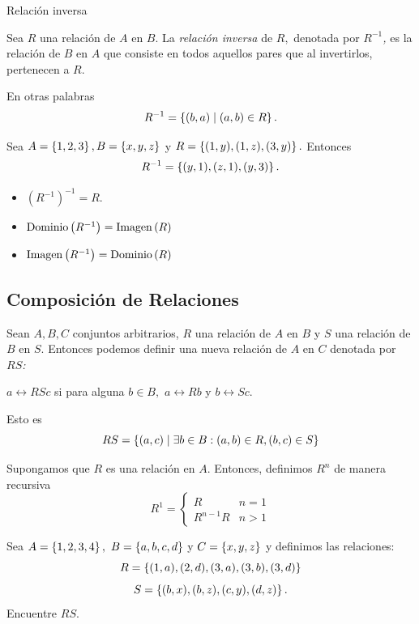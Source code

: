 	{Relación inversa}
	
	Sea $R$ una relación de $A$ en $B.$ La \emph{relación inversa} de $R,$ denotada por \emph{$R^{-1}$,} es la relación de $B$ en $A$ que consiste en todos aquellos pares que al invertirlos, pertenecen a $R.$ 
	
	En otras palabras
	$$
	R^{-1}=\left\{ (b,a)\mid (a,b)\in R \right\}.
	$$



	\begin{problema}
		Sea $A=\left\{ 1,2,3 \right\}, B=\left\{ x,y,z \right\}$ y $R=\left\{ (1,y),(1,z),(3,y) \right\}.$ Entonces
		$$
		R^{-1}=\left\{ (y,1), (z,1), (y,3) \right\}.
		$$
	\end{problema}



	\begin{rem}
		\begin{itemize}
			\item $\left( R^{-1} \right)^{-1}=R.$
			\item $\operatorname{Dominio}\left( R^{-1} \right)=\operatorname{Imagen}\left( R \right)$
			\item $\operatorname{Imagen}\left( R^{-1} \right)=\operatorname{Dominio}\left( R \right)$
		\end{itemize}
	\end{rem}




\subsection{Composición de Relaciones}

	Sean $A,B,C$ conjuntos arbitrarios, $R$ una relación de $A$ en $B$ y $S$ una relación de $B$ en $S.$  Entonces podemos definir una nueva relación de $A$ en $C$ denotada por \emph{$RS$:}
	\begin{center}
		$a\rel{{RS}}c$ si para alguna $b \in B,$ $a\rel{R}b$ y $b\rel{S}c.$
	\end{center} 



	Esto es
	$$
	RS=\left\{ (a,c)\mid \exists b\in B: (a,b)\in R, (b,c)\in S \right\}
	$$



	Supongamos que $R$ es una relación en $A.$ Entonces, definimos $R^{n}$ de manera recursiva
	$$
	R^{1}=
	\begin{cases}
		R & n=1 \\
		R^{n-1}R & n>1
	\end{cases}
	$$



	\begin{problema}
		Sea $A=\left\{ 1,2,3,4 \right\},$ $B=\left\{ a,b,c,d \right\}$ y $C=\left\{ x,y,z \right\}$ y definimos las relaciones: 
		$$R=\left\{ (1,a),(2,d),(3,a),(3,b),(3,d) \right\}$$  $$S=\left\{ (b,x),(b,z),(c,y),(d,z) \right\}.$$ Encuentre $RS.$
	\end{problema}
	



